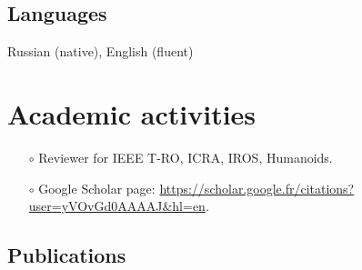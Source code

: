 \documentclass[a4paper,10pt]{report}
\begin{document}
\begin{adjustwidth}{0.5cm}{0pt}
\subsection{Languages}
\begin{adjustwidth}{0.5cm}{0pt}
    Russian (native), English (fluent)
\end{adjustwidth}
\end{adjustwidth}


\vspace{0.15cm}
\section{Academic activities}
\begin{itemize}
    \item[$\circ$] Reviewer for IEEE T-RO, ICRA, IROS, Humanoids.
    \item[$\circ$] Google Scholar page: \url{https://scholar.google.fr/citations?user=yVOvGd0AAAAJ&hl=en}.
\end{itemize}

\subsection{\hspace{0.5cm}Publications}
\nocite{*}
    \begin{tcolorbox}[
            breakable,
            skin=enhanced,
            lines before break=0,
            after={},
            colframe=white,
            colback=white,
            coltitle=white,
            colbacktitle=white,
            width=\linewidth,
            bottomrule=0cm,
            leftrule=0cm,
            rightrule=0cm,
            titlerule=0cm,
            arc=0.0cm,
            boxsep=0cm,
            left=1.0cm,
            right=0.0cm,
            toptitle=0.00cm,
            bottom=0.00cm,
            top=0.00cm,
        ]
        \printbibliography[heading=none]
    \end{tcolorbox}

\end{document}
